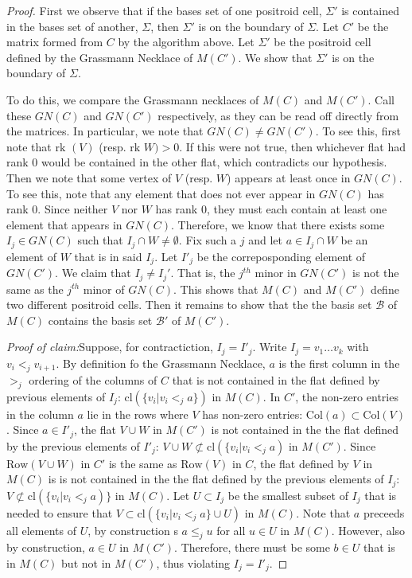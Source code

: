\documentclass[11pt]{article}
\newcommand{\rk}{\textrm{rk }}
\newcommand{\cB}{\mathcal{B}}
\newcommand{\Rows}{\textrm{Row}}
\newcommand{\Cols}{\textrm{Col}}
\theoremstyle{remark}
\theoremstyle{definition}
\begin{document}
\begin{proof} First we observe that if the bases set of one positroid cell, $\Sigma'$ is contained in the bases set of another, $\Sigma$, then $\Sigma'$ is on the boundary of $\Sigma$. Let $C'$ be the matrix formed from $C$ by the algorithm above. Let $\Sigma'$ be the positroid cell defined by the Grassmann Necklace of $M(C')$. We show that $\Sigma'$ is on the boundary of $\Sigma$. 

To do this, we compare the Grassmann necklaces of $M(C)$ and $M(C')$. Call these $GN(C)$ and $GN(C')$ respectively, as they can be read off directly from the matrices. In particular, we note that $GN(C) \neq GN(C')$. To see this, first note that $\rk(V)$ (resp. $\rk W) >0$. If this were not true, then whichever flat had rank $0$ would be contained in the other flat, which contradicts our hypothesis. Then we note that some vertex of $V$ (resp. $W$)  appears at least once in $GN(C)$. To see this, note that any element that does not ever appear in $GN(C)$ has rank $0$. Since neither $V$ nor $W$ has rank $0$, they must each contain at least one element that appears in $GN(C)$. Therefore, we know that there exists some $I_j \in GN(C)$ such that $I_j \cap W \neq \emptyset$. Fix such a $j$ and let $a \in  I_j \cap W$ be an element of $W$ that is in said $I_j$. Let $I'_j$ be the correposponding element of $GN(C')$. We claim that $I_j \neq I_j'$. That is, the $j^{th}$ minor in $GN(C')$ is not the same as the $j^{th}$ minor of $GN(C)$. This shows that $M(C)$ and $M(C')$ define two different positroid cells. Then it remains to show that the the basis set $\cB$ of $M(C)$ contains the basis set $\cB'$ of $M(C')$. 

\emph{Proof of claim:}Suppose, for contractiction, $I_j = I'_j$. Write $I_j = v_1 \ldots v_k$ with $v_i <_j v_{i+1}$. By definition fo the Grassmann Necklace, $a$ is the first column in the $>_j$ ordering of the columns of $C$ that is not contained in the flat defined by previous elements of $I_j$: $\textrm{cl}(\{v_i | v_i <_j a \})$ in $M(C)$. In $C'$, the non-zero entries in the column $a$ lie in the rows where $V$ has non-zero entries: $\Cols(a) \subset \Cols(V)$. Since $a \in I'_j$, the flat $V \cup W$ in $M(C')$ is not contained in the the flat defined by the previous elements of $I'_j$: $V \cup W \not \subset \textrm{cl}(\{v_i | v_i <_j a )$ in $M(C')$. Since $\Rows(V \cup W)$ in $C'$ is the same as $\Rows(V)$ in $C$, the flat defined by $V$ in $M(C)$ is is not contained in the the flat defined by the previous elements of $I_j$: $V\not \subset \textrm{cl}(\{v_i | v_i <_j a ) \}$ in $M(C)$. Let $U \subset I_j$ be the smallest subset of $I_j$ that is needed to ensure that $V \subset \textrm{cl}(\{v_i | v_i <_j a \} \cup U)$ in $M(C)$. Note that $a$ preceeds all elements of $U$, by construction s $a \leq_j u$ for all $u \in U$ in $M(C)$. However, also by construction, $a \in U$ in $M(C')$. Therefore, there must be some $b \in U$ that is in $M(C)$ but not in $M(C')$, thus violating $I_j = I'_j$.
 

\end{proof}
\end{document}
